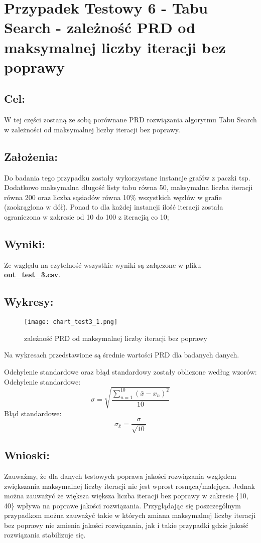 \section{Przypadek Testowy 6 - Tabu Search - zależność PRD od maksymalnej liczby iteracji bez poprawy}
  \subsection{Cel:}
    W tej części zostaną ze sobą porównane PRD rozwiązania algorytmu Tabu Search w zależności od maksymalnej liczby iteracji bez poprawy.
    \subsection{Założenia:}
    Do badania tego przypadku zostały wykorzystane instancje grafów z paczki tsp. Dodatkowo maksymalna długość listy tabu równa 50, maksymalna liczba iteracji równa 200 oraz liczba sąsiadów równa 10\% wszystkich węzłów w grafie (zaokrąglona w dół). Ponad to dla każdej instancji ilość iteracji została ograniczona w zakresie od 10 do 100 z iteracjią co 10;
  \subsection{Wyniki: }
    Ze względu na czytelność wszystkie wyniki są załączone w pliku \textbf{out\_test\_3.csv}.
  \subsection{Wykresy: }
    \begin{figure}[H]
      \texttt{[image: chart\_test3\_1.png]}
      \centering
      \caption{zależność PRD od maksymalnej liczby iteracji bez poprawy}
    \end{figure}
    
    Na wykresach przedstawione są średnie wartości PRD dla badanych danych.

    Odchylenie standardowe oraz błąd standardowy zostały obliczone według wzorów: \\
    Odchylenie standardowe:
    \[ \sigma = \sqrt{\frac{\sum_{n = 1}^{10}(\bar{x} - x_n)^2}{10}} \]
    Błąd standardowe:
    \[ \sigma_{\bar{x}} = \frac{\sigma}{\sqrt{10}} \]

  \subsection{Wnioski: }
    Zauważmy, że dla danych testowych poprawa jakości rozwiązania względem zwiększania maksymalnej liczby iteracji nie jest wprost rosnąca/malejąca. Jednak można zauważyć że większa większa liczba iteracji bez poprawy w zakresie \{10, 40\} wpływa na poprawe jakości rozwiązania. Przyglądając się poszczególnym przypadkom można zauważyć takie w których zmiana maksymalnej liczby iteracji bez poprawy nie zmienia jakości rozwiązania, jak i takie przypadki gdzie jakość rozwiązania stabilizuje się.

